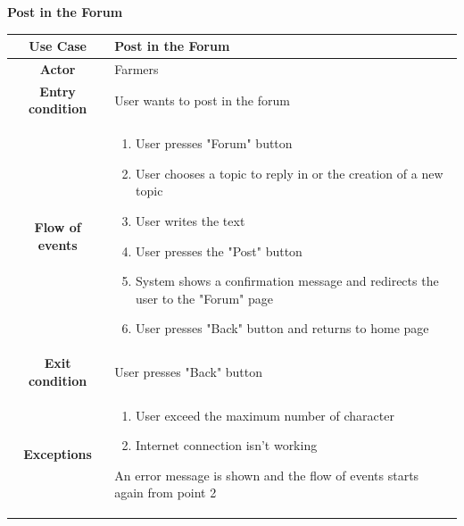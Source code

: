 \documentclass[table, 12pt]{article}
\begin{document}
\begin{itemize}
            \begin{table}[H]
                \item[] \textbf{Post in the Forum}
                \item[] 
                \centering
                \begin{tabular}{|c| m{}|}
                    \hline
                    \textbf{Use Case} & Post in the Forum\\ \hline
                    \textbf{Actor} & Farmers\\ \hline
                    \textbf{Entry condition} & User wants to post in the forum\\  \hline
                    \textbf{Flow of events} & \begin{enumerate}
                                                \item User presses "Forum" button
                                                \item User chooses a topic to reply in or the creation of a new topic
                                                \item User writes the text
                                                \item User presses the "Post" button
                                                \item System shows a confirmation message and redirects the user to the "Forum" page
                                                \item User presses "Back" button and returns to home page 
                                            \end{enumerate}\\ \hline
                    \textbf{Exit condition} & User presses "Back" button\\ \hline
                    \textbf{Exceptions} &  \begin{enumerate}
                        \item User exceed the maximum number of character 
                        \item Internet connection isn't working
                    \end{enumerate}
                    An error message is shown and the flow of events starts again from point 2\\ \hline                    
                \end{tabular}
            \end{table}


\end{itemize}
\end{document}

